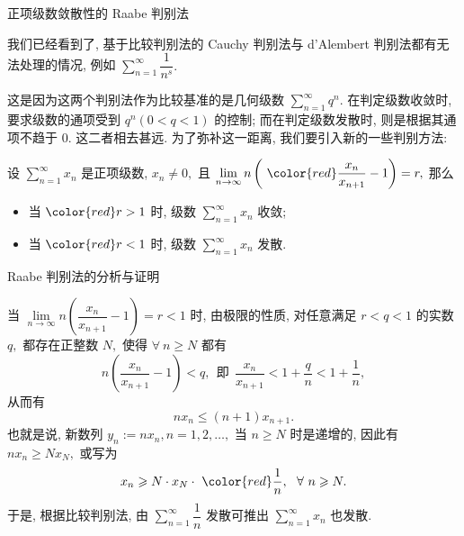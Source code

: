 \begin{frame}{正项级数敛散性的 Raabe 判别法}

我们已经看到了, 基于比较判别法的 Cauchy 判别法与 d'Alembert 判别法都有无法处理的情况, 例如 $\sum\limits_{n=1}^\infty \dfrac{1}{n^s}.$

\pause
\vspace{-0.6em}

这是因为这两个判别法作为比较基准的是几何级数 $\sum\limits_{n=1}^\infty q^n.$ 在判定级数收敛时, 要求级数的通项受到 $q^n (0 < q < 1)$ 的控制; 而在判定级数发散时, 则是根据其通项不趋于 $0.$ 这二者相去甚远. 为了弥补这一距离, 我们要引入新的一些判别方法:

\pause

\begin{thm}
设 $\sum\limits_{n=1}^\infty x_n$ 是正项级数, $x_n \neq 0,$ 且 $\lim\limits_{n\to\infty} n \left( ~ {\color{red}\dfrac{x_n}{x_{n+1}}} - 1 \right) = r,$ 那么
\vspace{-0.6em}
\begin{itemize}
\item[(1).] 当 ${\color{red}r > 1}$ 时, 级数 $\sum\limits_{n=1}^\infty x_n$ {\color{red}收敛};
\item[(2).] 当 ${\color{red}r < 1}$ 时, 级数 $\sum\limits_{n=1}^\infty x_n$ {\color{red}发散}.
\end{itemize}
\end{thm}

\end{frame}


\begin{frame}{Raabe 判别法的分析与证明}

当 $\lim\limits_{n\to\infty} n \left( \dfrac{x_n}{x_{n+1}} - 1 \right) = r < 1$ 时, 由极限的性质, 对任意满足 $r < q < 1$ 的实数 $q,$ 都存在正整数 $N,$ 使得 $\forall~n \geqslant N$ 都有
\[n \left( \dfrac{x_n}{x_{n+1}} - 1 \right) < q, ~~ \text{即} ~~ \dfrac{x_n}{x_{n+1}} < 1 + \dfrac{q}{n} < 1 + \dfrac{1}{n},\]
从而有
\[n x_n \leqslant (n+1) x_{n+1}.\]
\pause
也就是说, 新数列 $y_n := nx_n, n = 1, 2, \dots,$ 当 $n \geqslant N$ 时是递增的, 因此有 $n x_n \geqslant N x_N,$ 或写为
\[x_n \geqslant N \cdot x_N \cdot ~ {\color{red} \dfrac{1}{n}}, ~~ \forall~n \geqslant N.\]
于是, 根据比较判别法, 由 $\sum\limits_{n=1}^\infty \dfrac{1}{n}$ 发散可推出 $\sum\limits_{n=1}^\infty x_n$ 也发散.

\end{frame}

